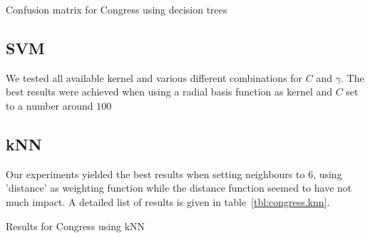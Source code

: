 \begin{table}[tb]
\centering

\caption{Confusion matrix for Congress using decision trees}
\label{tbl:congress.dt.cm}
\end{table}

\subsection{SVM}
We tested all available kernel and various different combinations for $C$ and $\gamma$. 
The best results were achieved when using a radial basis function as kernel and $C$ set to a number around $100$

\subsection{kNN}
Our experiments yielded the best results when setting neighbours to $6$, using 'distance' as weighting function while the distance function seemed to have not much impact. 
A detailed list of results is given in table~\ref{tbl:congress.knn}. 
\begin{table}[tb]
\centering

\caption{Results for Congress using kNN}
\label{tbl:congress.knn}
\end{table}

